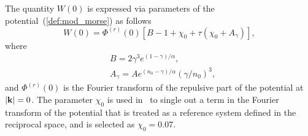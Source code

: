 \documentclass[12pt]{article}
\begin{document}
	The quantity $W(0)$ is expressed via parameters of the potential~(\ref{def:mod_morse}) as follows
	\begin{equation}
	W(0) = \Phi^{(r)}(0) \left[ B - 1 + \chi_0 + \tau (\chi_0 + A_\gamma) \right],
	\end{equation}
	where
	\begin{align} 
		& B = 2 \gamma^3 e^{(1-\gamma)/\alpha},\nonumber \\
		& A_\gamma = A e^{(n_0-\gamma)/\alpha} \left( \gamma / n_0\right)^3,
	\end{align}
	and $\Phi^{(r)}(0)$ is the Fourier transform of the repulsive part of the potential at $\abs{\vb k}=0$. The parameter $\chi_0$ is used in~\cite{KozlovskiiDobush2020} to single out a term in the Fourier transform of the potential that is treated as a reference system defined in the reciprocal space, and is selected as $\chi_0 = 0.07$.
	
\end{document}
